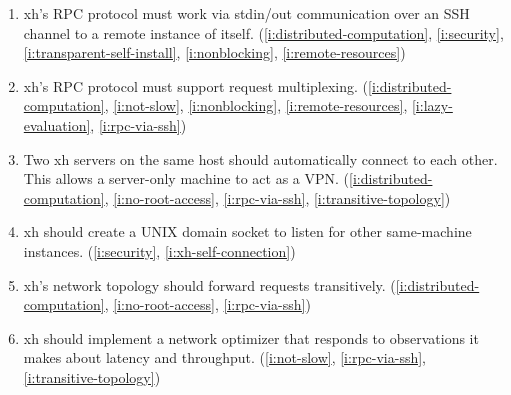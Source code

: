 \documentclass{report}
\begin{document}
\begin{enumerate}
\item{}\label{i:rpc-via-ssh}
  xh's RPC protocol must work via stdin/out communication over an SSH
  channel to a remote instance of itself.
    (\ref{i:distributed-computation},
     \ref{i:security},
     \ref{i:transparent-self-install},
     \ref{i:nonblocking},
     \ref{i:remote-resources})
\item{}\label{i:rpc-multiplexing}
  xh's RPC protocol must support request multiplexing.
    (\ref{i:distributed-computation},
     \ref{i:not-slow},
     \ref{i:nonblocking},
     \ref{i:remote-resources},
     \ref{i:lazy-evaluation},
     \ref{i:rpc-via-ssh})
\item{}\label{i:xh-self-connection}
  Two xh servers on the same host should automatically connect to each
  other. This allows a server-only machine to act as a VPN.
    (\ref{i:distributed-computation},
     \ref{i:no-root-access},
     \ref{i:rpc-via-ssh},
     \ref{i:transitive-topology})
\item{}\label{i:domain-sockets}
  xh should create a UNIX domain socket to listen for other same-machine
  instances.
    (\ref{i:security},
     \ref{i:xh-self-connection})
\item{}\label{i:transitive-topology}
  xh's network topology should forward requests transitively.
    (\ref{i:distributed-computation},
     \ref{i:no-root-access},
     \ref{i:rpc-via-ssh})
\item{}\label{i:network-routing}
  xh should implement a network optimizer that responds to observations it
  makes about latency and throughput.
    (\ref{i:not-slow},
     \ref{i:rpc-via-ssh},
     \ref{i:transitive-topology})
\end{enumerate}
\end{document}
